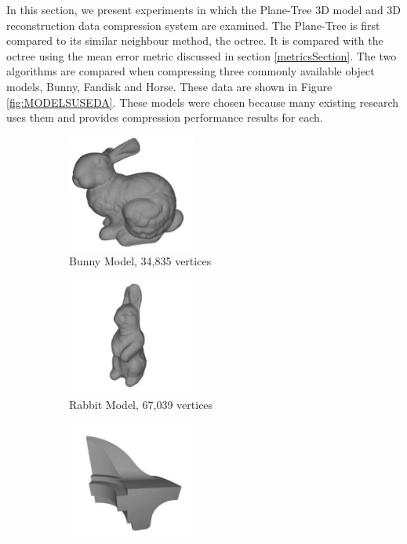 
In this section, we present experiments in which the Plane-Tree 3D model and 3D reconstruction data compression system are examined. The Plane-Tree is first compared to its similar neighbour method, the octree. It is compared with the octree using the mean error metric discussed in section \ref{metricsSection}. The two algorithms are compared when compressing three commonly available object models, Bunny, Fandisk and Horse. These data are shown in Figure \ref{fig:MODELSUSEDA}. These models were chosen because many existing research uses them and provides compression performance results for each. \\


\begin{figure}[t] 
        \begin{center}
 		\begin{subfigure}[b]{4.4cm}
 			   \centering
 			   \includegraphics[width=4.2cm]{images/experiments/test_data/models_used/bunny_34835}
 			   \captionsetup{justification=centering}
                \caption{Bunny Model, 34,835 vertices}
                \label{fig:MODELSUSEDA_BUNNY}
        \end{subfigure}%
        \begin{subfigure}[b]{4.4cm}
                \includegraphics[width=4.2cm]{images/experiments/test_data/models_used/rabbit_67039}
                \captionsetup{justification=centering}
                \caption{Rabbit Model, 67,039 vertices}
                \label{fig:MODELSUSEDA_RABBIT}
        \end{subfigure}
        \begin{subfigure}[b]{4.4cm}
                \includegraphics[width=4.2cm]{images/experiments/test_data/models_used/fandisk_6475}

\end{subfigure}
\end{center}
\end{figure}
